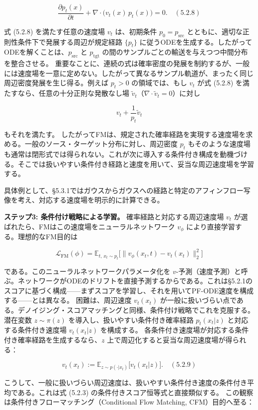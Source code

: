 \[
\frac{\partial p_t(x)}{\partial t}+\nabla\cdot\bigl(v_t(x)\,p_t(x)\bigr)=0. \quad (5.2.8)
\]


式 (5.2.8) を満たす任意の速度場 $v_t$ は、初期条件 $p_0=p_{\mathrm{src}}$ とともに、適切な正則性条件下で発展する周辺が規定経路 $\{p_t\}$ に従うODEを生成する。したがってODEを解くことは、$p_{\mathrm{src}}$ と $p_{\mathrm{tgt}}$ の間のサンプルごとの輸送を与えつつ中間分布を整合させる。
重要なことに、連続の式は確率密度の発展を制約するが、一般には速度場を一意に定めない。したがって異なるサンプル軌道が、まったく同じ周辺密度発展を生じ得る。例えば $p_t>0$ の領域では、もし $v_t$ が式 (5.2.8) を満たすなら、任意の十分正則な発散なし場 $\tilde{v}_t$（$\nabla\cdot\tilde{v}_t=0$）に対し

\[
v_t+\frac{1}{p_t}\tilde{v}_t
\]


もそれを満たす。
したがってFMは、規定された確率経路を実現する速度場を求める。一般のソース・ターゲット分布に対し、周辺密度 $p_t$ もそのような速度場も通常は閉形式では得られない。これが次に導入する条件付き構成を動機づける。そこでは扱いやすい条件付き経路と速度を用いて、妥当な周辺速度場を学習する。


具体例として、§5.3.1ではガウスからガウスへの経路と特定のアフィンフロー写像を考え、対応する速度場を明示的に計算できる。

\textbf{ステップ3: 条件付け戦略による学習。} 確率経路と対応する周辺速度場 $v_t$ が選ばれたら、FMはこの速度場をニューラルネットワーク $v_\phi$ により直接学習する。理想的なFM目的は

\[
\mathcal{L}_{\mathrm{FM}}(\phi)=\mathbb{E}_{t,\,x_t\sim p_t}\bigl[\|v_\phi(x_t,t)-v_t(x_t)\|_2^2\bigr]
\]


である。このニューラルネットワークパラメータ化を $v$-予測（速度予測）と呼ぶ。ネットワークがODEのドリフトを直接予測するからである。これは§5.2.1のスコアに基づく構成——まずスコアを学習し、それを用いてPF-ODE速度を構成する——とは異なる。
困難は、周辺速度 $v_t(x_t)$ が一般に扱いづらい点である。デノイジング・スコアマッチングと同様、条件付け戦略でこれを克服する。潜在変数 $z\sim\pi(z)$ を導入し、扱いやすい条件付き確率経路 $p_t(x_t|z)$ と対応する条件付き速度場 $v_t(x_t|z)$ を構成する。
各条件付き速度場が対応する条件付き確率経路を生成するなら、$z$ 上で周辺化すると妥当な周辺速度場が得られる：

\[
v_t(x_t):=\mathbb{E}_{z\sim p(\cdot|x_t)}\bigl[v_t(x_t|z)\bigr]. \quad (5.2.9)
\]


こうして、一般に扱いづらい周辺速度は、扱いやすい条件付き速度の条件付き平均である。これは式 (5.2.3) の条件付きスコア恒等式と直接類似する。
この観察は条件付きフローマッチング（Conditional Flow Matching, CFM）目的へ至る：

